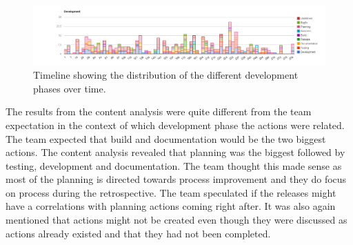 \begin{table}[!h]
	\begin{center}
	\caption{Results from the content analysis in which development phase the action regards.}
	\label{table:development-results}
	\end{center}
\end{table}

\begin{figure}
	\centering
	\includegraphics[width=\textwidth, keepaspectratio]{figures/development-l.png}
	\caption{Timeline showing the distribution of the different development phases over time.}
	\label{figure:development-l}
\end{figure}

The results from the content analysis were quite different from the team expectation in the context of which development phase the actions were related. The team expected that build and documentation would be the two biggest actions. The content analysis revealed that planning was the biggest followed by testing, development and documentation. The team thought this made sense as most of the planning is directed towards process improvement and they do focus on process during the retrospective. The team speculated if the releases might have a correlations with planning actions coming right after. It was also again mentioned that actions might not be created even though they were discussed as actions already existed and that they had not been completed. 

